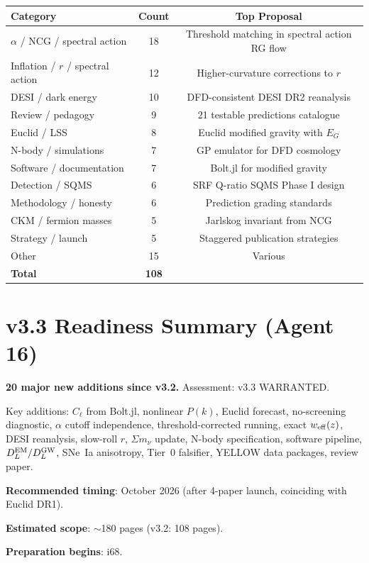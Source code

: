 \documentclass[11pt,a4paper]{article}
\begin{document}
\begin{center}
\begin{tabular}{lcc}
\toprule
\textbf{Category} & \textbf{Count} & \textbf{Top Proposal} \\
\midrule
$\alpha$ / NCG / spectral action & 18 & Threshold matching in spectral action RG flow \\
Inflation / $r$ / spectral action & 12 & Higher-curvature corrections to $r$ \\
DESI / dark energy & 10 & DFD-consistent DESI DR2 reanalysis \\
Review / pedagogy & 9 & 21 testable predictions catalogue \\
Euclid / LSS & 8 & Euclid modified gravity with $E_G$ \\
N-body / simulations & 7 & GP emulator for DFD cosmology \\
Software / documentation & 7 & Bolt.jl for modified gravity \\
Detection / SQMS & 6 & SRF Q-ratio SQMS Phase I design \\
Methodology / honesty & 6 & Prediction grading standards \\
CKM / fermion masses & 5 & Jarlskog invariant from NCG \\
Strategy / launch & 5 & Staggered publication strategies \\
Other & 15 & Various \\
\midrule
\textbf{Total} & \textbf{108} & \\
\bottomrule
\end{tabular}
\end{center}


\section{v3.3 Readiness Summary (Agent 16)}
\label{sec:v33}

\textbf{20 major new additions since v3.2.} Assessment: v3.3 WARRANTED.

Key additions: $C_\ell$ from Bolt.jl, nonlinear $P(k)$, Euclid forecast, no-screening diagnostic, $\alpha$ cutoff independence, threshold-corrected running, exact $w_{\rm eff}(z)$, DESI reanalysis, slow-roll $r$, $\Sigma m_\nu$ update, N-body specification, software pipeline, $D_L^{\rm EM}/D_L^{\rm GW}$, SNe~Ia anisotropy, Tier~0 falsifier, YELLOW data packages, review paper.

\textbf{Recommended timing}: October 2026 (after 4-paper launch, coinciding with Euclid DR1).

\textbf{Estimated scope}: $\sim$180 pages (v3.2: 108 pages).

\textbf{Preparation begins}: i68.
\end{document}
